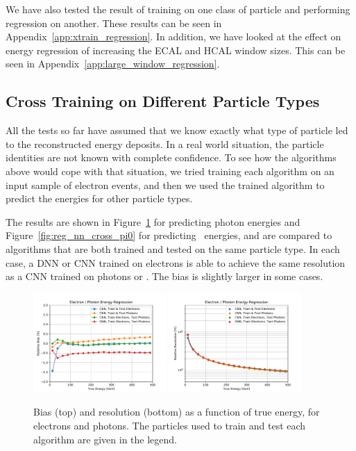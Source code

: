 We have also tested the result of training on one class of particle and performing regression on another. These results can be seen in Appendix~\ref{app:xtrain_regression}. In addition, we have looked at the effect on energy regression of increasing the ECAL and HCAL window sizes. This can be seen in Appendix~\ref{app:large_window_regression}.

\subsection*{Cross Training on Different Particle Types}

All the tests so far have assumed that we know exactly what type of particle led to the reconstructed energy deposits.  In a real world situation, the particle identities are not known with complete confidence.  To see how the algorithms above would cope with that situation, we tried training each algorithm on an input sample of electron events, and then we used the trained algorithm to predict the energies for other particle types.

The results are shown in Figure~\ref{fig:reg_nn_cross_gamma} for predicting photon energies and Figure~\ref{fig:reg_nn_cross_pi0} for predicting \pizero\ energies, and are compared to algorithms that are both trained and tested on the same particle type.  In each case, a DNN or CNN trained on electrons is able to achieve the same resolution as a CNN trained on photons or \pizero.  The bias is slightly larger in some cases.

\begin{figure}[hbp]
\centering
\includegraphics[width=0.45\textwidth]{Images/Calo/bias_vs_E_EleGammaFixed_nn_cross_zoom.pdf}
\includegraphics[width=0.45\textwidth]{Images/Calo/res_vs_E_EleGammaFixed_nn_cross_fits.pdf}
\caption{Bias (top) and resolution (bottom) as a function of true energy, for electrons and photons.  The particles used to train and test each algorithm are given in the legend.
}
\label{fig:reg_nn_cross_gamma}
\end{figure}


